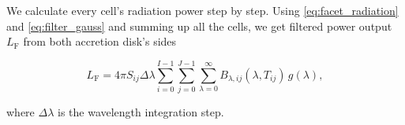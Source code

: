     We calculate every cell's radiation power step by step. Using \eqref{eq:facet_radiation} and \eqref{eq:filter_gauss} and summing up all the cells, we get filtered power output $L_{\mathrm{F}}$ from both accretion disk's sides

    \begin{equation}
    L_{\mathrm{F}} = 4 \pi S_{ij} \Delta \lambda \sum_{i=0}^{I-1} \sum_{j=0}^{J-1} \sum_{\lambda=0}^{\infty} B_{\lambda,ij}(\lambda, T_{ij})\,g(\lambda),
    \end{equation}

    where $\Delta \lambda$ is the wavelength integration step.
